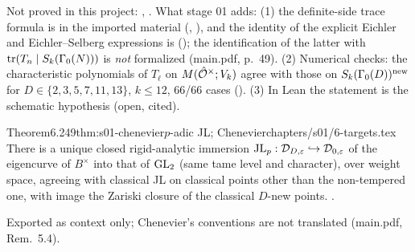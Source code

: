 \begin{outline}
Not proved in this project: \stcited{} \cite[Thm.~16.1]{JL}, \cite[Thm.~2]{Buz04}. What stage 01 adds: (1) the definite-side
trace formula is \stformal{} in the imported material (, ), and the identity of the
explicit Eichler and Eichler--Selberg expressions is \stformal{} (); the identification of the latter with
$\operatorname{tr}(T_n\mid S_k(\Gamma_0(N)))$ is \emph{not} formalized (main.pdf, p.~49). (2) Numerical checks: the characteristic polynomials of $T_\ell$ on
$M(\hat{\mathcal{O}}^\times;V_k)$ agree with those on $S_k(\Gamma_0(D))^{\rm new}$ for $D\in\{2,3,5,7,11,13\}$, $k\le12$, 66/66 cases \stcomp{}
(). (3) In Lean the statement is the schematic hypothesis  (open, cited).
\end{outline}

\begin{quoted}{Theorem}{6.2}{49}{thm:s01-chenevier}{$p$-adic JL; Chenevier}{chapters/s01/6-targets.tex}\label{rpt:thm:s01-chenevier}
There is a unique closed rigid-analytic immersion $\mathrm{JL}_p:\mathcal D_{D,\varepsilon}\hookrightarrow\mathcal D_{0,\varepsilon}$ of the
eigencurve of $B^\times$ into that of $\mathrm{GL}_2$ (same tame level and character), over weight space, agreeing with classical JL on
classical points other than the non-tempered one, with image the Zariski closure of the classical $D$-new points.
\stcited{} \cite[Thm.~3, \S4.6, p.~188]{Ch}.
\end{quoted}
\noindent Exported as context only; Chenevier's conventions are not translated (main.pdf, Rem.~5.4).

